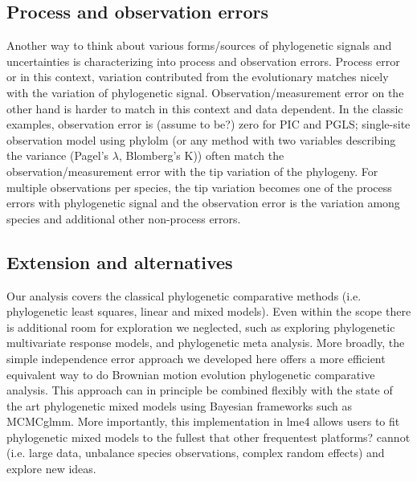\subsection{Process and observation errors}

Another way to think about various forms/sources of phylogenetic signals and uncertainties is characterizing into process and observation errors.
Process error or in this context, variation contributed from the evolutionary matches nicely with the variation of phylogenetic signal. 
Observation/measurement error on the other hand is harder to match in this context and data dependent.
In the classic examples, observation error is (assume to be?) zero for PIC and PGLS; single-site observation model using phylolm (or any method with two variables describing the variance (Pagel's $\lambda$, Blomberg's K)) often match the observation/measurement error with the tip variation of the phylogeny.
For multiple observations per species, the tip variation becomes one of the process errors with phylogenetic signal and the observation error is the variation among species and additional other non-process errors.

\subsection{Extension and alternatives}

Our analysis covers the classical phylogenetic comparative methods (i.e. phylogenetic least squares, linear and mixed models).
Even within the scope there is additional room for exploration we neglected, such as exploring phylogenetic multivariate response models, and phylogenetic meta analysis.
More broadly, the simple independence error approach we developed here offers a more efficient equivalent way to do Brownian motion evolution phylogenetic comparative analysis. 
This approach can in principle be combined flexibly with the state of the art phylogenetic mixed models using Bayesian frameworks such as MCMCglmm. 
More importantly, this implementation in lme4 allows users to fit phylogenetic mixed models to the fullest that other frequentest platforms? cannot (i.e. large data, unbalance species observations, complex random effects) and explore new ideas.

